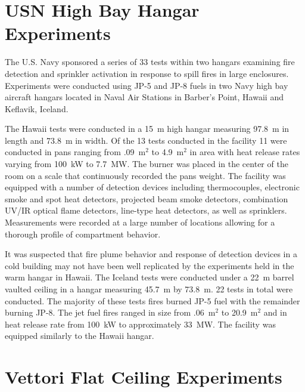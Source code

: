 \section{USN High Bay Hangar Experiments}

The U.S. Navy sponsored a series of 33 tests within two hangars examining fire detection and sprinkler activation in response to spill fires in large enclosures. Experiments were conducted using JP-5 and JP-8 fuels in two Navy high bay aircraft hangars located in Naval Air Stations in Barber's Point, Hawaii and Keflavik, Iceland.

The Hawaii tests were conducted in a 15~m high hangar measuring 97.8~m in length and 73.8~m in width. Of the 13 tests conducted in the facility 11 were conducted in pans ranging from .09~m$^2$ to 4.9~m$^2$ in area with heat release rates varying from 100~kW to 7.7~MW. The burner was placed in the center of the room on a scale that continuously recorded the pans weight. The facility was equipped with a number of detection devices including thermocouples, electronic smoke and spot heat detectors, projected beam smoke detectors, combination UV/IR optical flame detectors, line-type heat detectors, as well as sprinklers. Measurements were recorded at a large number of locations allowing for a thorough profile of compartment behavior.

It was suspected that fire plume behavior and response of detection devices in a cold building may not have been well replicated by the experiments held in the warm hangar in Hawaii. The Iceland tests were conducted under a 22~m barrel vaulted ceiling in a hangar measuring 45.7~m by 73.8~m. 22 tests in total were conducted. The majority of these tests fires burned JP-5 fuel with the remainder burning JP-8. The jet fuel fires ranged in size from .06~m$^2$ to 20.9~m$^2$ and in heat release rate from 100~kW to approximately 33~MW. The facility was equipped similarly to the Hawaii hangar.



\section{Vettori Flat Ceiling Experiments}

